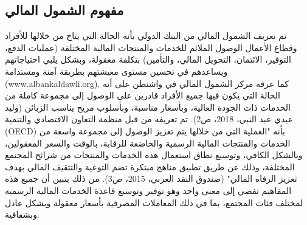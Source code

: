 \documentclass[10pt,a4paper]{report}
\begin{document}
\begin{doublespacing}
\subsection{مفهوم الشمول المالي}
\sloppy
تم تعريف الشمول المالي من البنك الدولي بأنه الحالة التي يتاح من خلالها للأفراد وقطاع الأعمال الوصول الملائم للخدمات والمنتجات المالية المختلفة (عمليات الدفع، التوفير، الائتمان، التحويل المالي، والتأمين) بتكلفة معقولة، وبشكل يلبي احتياجاتهم ويساعدهم في تحسين مستوى معيشتهم بطريقة آمنة ومستدامة (www.albankaldawli.org). كما عرفه مركز الشمول المالي في واشنطن على أنه الحالة التي يكون فيها جميع الأفراد قادرين على الوصول إلى مجموعة كاملة من الخدمات ذات الجودة العالية، وبأسعار مناسبة، وبأسلوب مريح يناسب الزبائن (وليد عيدي عبد النبي، 2018، ص2). تم تعريفه من قبل منظمة التعاون الاقتصادي والتنمية (OECD) بأنه "العملية التي من خلالها يتم تعزيز الوصول إلى مجموعة واسعة من الخدمات والمنتجات المالية الرسمية والخاضعة للرقابة، بالوقت والسعر المعقولين، وبالشكل الكافي، وتوسيع نطاق استعمال هذه الخدمات والمنتجات من شرائح المجتمع المختلفة، وذلك عن طريق تطبيق مناهج مبتكرة تضم التوعية والتثقيف المالي بهدف تعزيز الرفاه المالي" (صندوق النقد العربي، 2015، ص3). من ذلك يتبين أن جميع هذه المفاهيم تفضي إلى معنى واحد وهو توفير وتوسيع قاعدة الخدمات المالية الرسمية لمختلف فئات المجتمع، بما في ذلك المعاملات المصرفية بأسعار معقولة وبشكل عادل وبشفافية.


\end{doublespacing}
\end{document}
